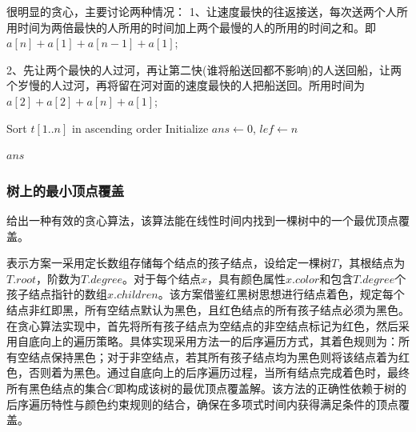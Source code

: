 \documentclass[./../main.tex]{subfiles}
\begin{document}
很明显的贪心，主要讨论两种情况： 1、让速度最快的往返接送，每次送两个人所用时间为两倍最快的人所用的时间加上两个最慢的人的所用的时间之和。即$a[n]+a[1]+a[n-1]+a[1]$;

2、先让两个最快的人过河，再让第二快(谁将船送回都不影响)的人送回船，让两个岁慢的人过河，再将留在河对面的速度最快的人把船送回。所用时间为$a[2]+a[2]+a[n]+a[1]$;

\begin{algorithm}
\caption{Minimum Time River Crossing}

Sort $t[1..n]$ in ascending order\;
Initialize $ans \gets 0$, $lef \gets n$\;

\Return $ans$\;
\end{algorithm}

\subsubsection{树上的最小顶点覆盖}
给出一种有效的贪心算法，该算法能在线性时间内找到一棵树中的一个最优顶点覆盖。

表示方案一采用定长数组存储每个结点的孩子结点，设给定一棵树$T$，其根结点为$T.root$，阶数为$T.degree$。对于每个结点$x$，具有颜色属性$x.color$和包含$T.degree$个孩子结点指针的数组$x.children$。该方案借鉴红黑树思想进行结点着色，规定每个结点非红即黑，所有空结点默认为黑色，且红色结点的所有孩子结点必须为黑色。在贪心算法实现中，首先将所有孩子结点为空结点的非空结点标记为红色，然后采用自底向上的遍历策略。具体实现采用方法一的后序遍历方式，其着色规则为：所有空结点保持黑色；对于非空结点，若其所有孩子结点均为黑色则将该结点着为红色，否则着为黑色。通过自底向上的后序遍历过程，当所有结点完成着色时，最终所有黑色结点的集合$C$即构成该树的最优顶点覆盖解。该方法的正确性依赖于树的后序遍历特性与颜色约束规则的结合，确保在多项式时间内获得满足条件的顶点覆盖。
\end{document}
